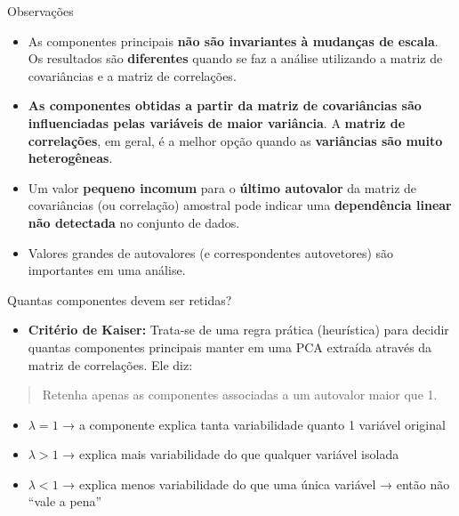 \documentclass[
  ignorenonframetext,
  aspectratio=169,
]{beamer}
\providecommand{\tightlist}{%
  \setlength{\itemsep}{0pt}\setlength{\parskip}{0pt}}
\begin{document}
\begin{frame}{Observações}
\label{observauxe7uxf5es}
\begin{itemize}
\tightlist
\item
  As componentes principais \textbf{não são invariantes à mudanças de
  escala}. Os resultados são \textbf{diferentes} quando se faz a análise
  utilizando a matriz de covariâncias e a matriz de correlações.
\end{itemize}

\pause

\begin{itemize}
\tightlist
\item
  \textbf{As componentes obtidas a partir da matriz de covariâncias são
  influenciadas pelas variáveis de maior variância}. A \textbf{matriz de
  correlações}, em geral, é a melhor opção quando as \textbf{variâncias
  são muito heterogêneas}.
\end{itemize}

\pause

\begin{itemize}
\tightlist
\item
  Um valor \textbf{pequeno incomum} para o \textbf{último autovalor} da
  matriz de covariâncias (ou correlação) amostral pode indicar uma
  \textbf{dependência linear não detectada} no conjunto de dados.
\end{itemize}

\pause

\begin{itemize}
\tightlist
\item
  Valores grandes de autovalores (e correspondentes autovetores) são
  importantes em uma análise.
\end{itemize}
\end{frame}

\begin{frame}{Quantas componentes devem ser retidas?}
\label{quantas-componentes-devem-ser-retidas}
\begin{itemize}
\tightlist
\item
  \textbf{Critério de Kaiser:} Trata-se de uma regra prática
  (heurística) para decidir quantas componentes principais manter em uma
  PCA extraída através da matriz de correlações. Ele diz:
\end{itemize}

\begin{quote}
Retenha apenas as componentes associadas a um autovalor maior que 1.
\end{quote}

\begin{itemize}
\tightlist
\item
  \(\lambda = 1\) → a componente explica tanta variabilidade quanto 1
  variável original
\item
  \(\lambda > 1\) → explica mais variabilidade do que qualquer variável
  isolada
\item
  \(\lambda < 1\) → explica menos variabilidade do que uma única
  variável → então não ``vale a pena''
\end{itemize}
\end{frame}
\end{document}
